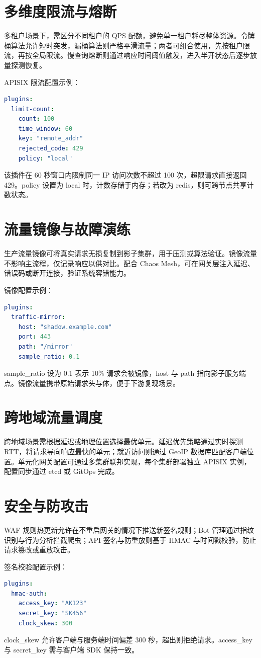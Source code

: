 \section{多维度限流与熔断}
多租户场景下，需区分不同租户的 QPS 配额，避免单一租户耗尽整体资源。令牌桶算法允许短时突发，漏桶算法则严格平滑流量；两者可组合使用，先按租户限流，再按全局限流。慢查询熔断则通过响应时间阈值触发，进入半开状态后逐步放量探测恢复。\par
APISIX 限流配置示例：\par
\begin{lstlisting}[language=yaml]
plugins:
  limit-count:
    count: 100
    time_window: 60
    key: "remote_addr"
    rejected_code: 429
    policy: "local"
\end{lstlisting}
该插件在 60 秒窗口内限制同一 IP 访问次数不超过 100 次，超限请求直接返回 429。policy 设置为 local 时，计数存储于内存；若改为 redis，则可跨节点共享计数状态。\par
\section{流量镜像与故障演练}
生产流量镜像可将真实请求无损复制到影子集群，用于压测或算法验证。镜像流量不影响主流程，仅记录响应以供对比。配合 Chaos Mesh，可在网关层注入延迟、错误码或断开连接，验证系统容错能力。\par
镜像配置示例：\par
\begin{lstlisting}[language=yaml]
plugins:
  traffic-mirror:
    host: "shadow.example.com"
    port: 443
    path: "/mirror"
    sample_ratio: 0.1
\end{lstlisting}
sample\_{}ratio 设为 0.1 表示 10\%{} 请求会被镜像，host 与 path 指向影子服务端点。镜像流量携带原始请求头与体，便于下游复现场景。\par
\section{跨地域流量调度}
跨地域场景需根据延迟或地理位置选择最优单元。延迟优先策略通过实时探测 RTT，将请求导向响应最快的单元；就近访问则通过 GeoIP 数据库匹配客户端位置。单元化网关配置可通过多集群联邦实现，每个集群部署独立 APISIX 实例，配置同步通过 etcd 或 GitOps 完成。\par
\section{安全与防攻击}
WAF 规则热更新允许在不重启网关的情况下推送新签名规则；Bot 管理通过指纹识别与行为分析拦截爬虫；API 签名与防重放则基于 HMAC 与时间戳校验，防止请求篡改或重放攻击。\par
签名校验配置示例：\par
\begin{lstlisting}[language=yaml]
plugins:
  hmac-auth:
    access_key: "AK123"
    secret_key: "SK456"
    clock_skew: 300
\end{lstlisting}
clock\_{}skew 允许客户端与服务端时间偏差 300 秒，超出则拒绝请求。access\_{}key 与 secret\_{}key 需与客户端 SDK 保持一致。\par
